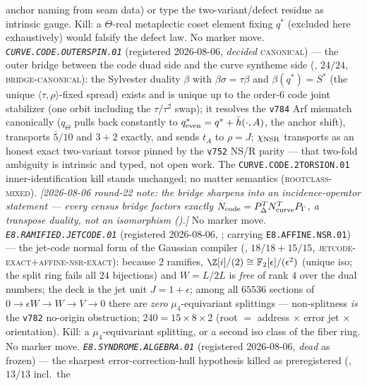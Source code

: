 anchor naming from seam data) or type the two-variant/defect
residue as intrinsic gauge.  Kill: a $\Theta$-real metaplectic
coset element fixing $q^{*}$ (excluded here exhaustively) would
falsify the defect law.  No marker move.
\emph{\texttt{CURVE.CODE.OUTERSPIN.01}} (registered 2026-08-06,
\emph{decided} \textsc{canonical}) --- the outer bridge between
the code duad side and the curve syntheme side
(, $24/24$,
\textsc{bridge-canonical}): the Sylvester duality $\beta$ with
$\beta\sigma=\tau\beta$ and $\beta(q^{*})=S^{*}$ (the unique
$\langle\tau,\rho\rangle$-fixed spread) exists and is unique up to
the order-6 code joint stabilizer (one orbit including the
$\tau/\tau^2$ swap); it resolves the \texttt{v784} Arf mismatch
canonically ($q_{\Theta}$ pulls back constantly to
$q^{*}_{\rm even}=q^{*}+\bar h(\cdot,A)$, the anchor shift),
transports $\bar5/10$ and $3{+}2$ exactly, and sends $t_A$ to
$\rho=J$; $\chi_{\rm NSR}$ transports as an honest exact
two-variant torsor pinned by the \texttt{v752} NS/R parity ---
that two-fold ambiguity is intrinsic and typed, not open work.
The \texttt{CURVE.CODE.2TORSION.01} inner-identification kill
stands unchanged; no matter semantics
(\textsc{rootclass-mixed}).  \emph{[2026-08-06 round-22 note: the
bridge sharpens into an incidence-operator statement --- every
census bridge factors exactly
$N_{\rm code}=P_\Delta^{T}N_{\rm curve}^{T}P_\Gamma$, a transpose
duality, not an isomorphism
().]}  No marker move.
\emph{\texttt{E8.RAMIFIED.JETCODE.01}} (registered 2026-08-06,
\mE; carrying \texttt{E8.AFFINE.NSR.01}) --- the jet-code normal
form of the Gaussian compiler
(, $18/18+15/15$,
\textsc{jetcode-exact}$+$\textsc{affine-nsr-exact}): because $2$
ramifies, $\Z[i]/(2)\cong\mathbb F_2[\epsilon]/(\epsilon^2)$
(unique iso; the split ring fails all $24$ bijections) and
$W=L/2L$ is \emph{free} of rank $4$ over the dual numbers; the
deck is the jet unit $J=1{+}\epsilon$; among all $65536$ sections
of $0\to\epsilon W\to W\to V\to0$ there are \emph{zero}
$\mu_4$-equivariant splittings --- non-splitness \emph{is} the
\texttt{v782} no-origin obstruction; $240=15\times8\times2$ (root
$=$ address $\times$ error jet $\times$ orientation).  Kill: a
$\mu_4$-equivariant splitting, or a second iso class of the fiber
ring.  No marker move.
\emph{\texttt{E8.SYNDROME.ALGEBRA.01}} (registered 2026-08-06,
\emph{dead} as frozen) --- the sharpest error-correction-hull
hypothesis killed as preregistered
(, $13/13$ incl.\ the
